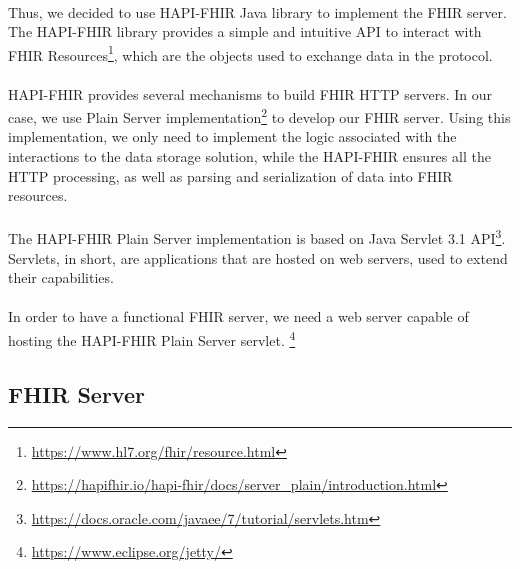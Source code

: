 \paragraph{} Thus, we decided to use HAPI-FHIR Java library to implement the \acs{FHIR} server. The HAPI-FHIR library provides a simple and intuitive \acs{API} to interact with \acs{FHIR} Resources\footnote{\url{https://www.hl7.org/fhir/resource.html}}, which are the objects used to exchange data in the protocol.

\paragraph{} HAPI-FHIR provides several mechanisms to build \acs{FHIR} \acs{HTTP} servers. In our case, we use Plain Server implementation\footnote{\url{https://hapifhir.io/hapi-fhir/docs/server_plain/introduction.html}} to develop our \acs{FHIR} server. Using this implementation, we only need to implement the logic associated with the interactions to the data storage solution, while the HAPI-FHIR ensures all the \acs{HTTP} processing, as well as parsing and serialization of data into \acs{FHIR} resources.

\paragraph{} The \acs{HAPI-FHIR} Plain Server implementation is based on Java Servlet  	
3.1 \acs{API}\footnote{\url{https://docs.oracle.com/javaee/7/tutorial/servlets.htm}}. Servlets, in short, are applications that are hosted on web servers, used to extend their capabilities. 

\paragraph{} In order to have a functional \acs{FHIR} server, we need a web server capable of hosting the \acs{HAPI-FHIR} Plain Server servlet. \footnote{\url{https://www.eclipse.org/jetty/}}

\subsection{FHIR Server} 

